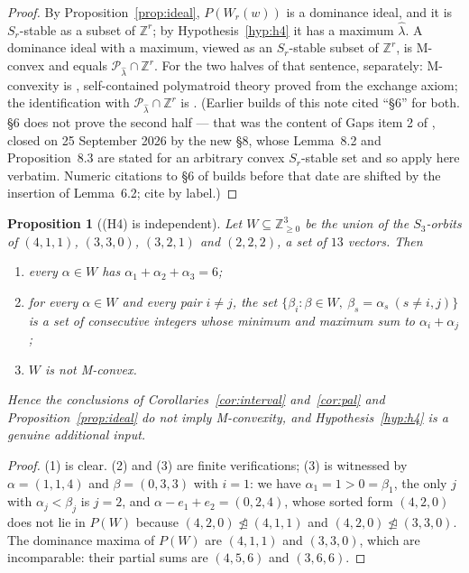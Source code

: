 \documentclass[11pt]{article}
\newtheorem{prop}[thm]{Proposition}
\theoremstyle{definition}
\newcommand{\Z}{\mathbb{Z}}
\begin{document}
\begin{proof}
By Proposition~\ref{prop:ideal}, $P(W_r(w))$ is a dominance ideal, and it is $S_r$-stable as a
subset of $\Z^r$; by Hypothesis~\ref{hyp:h4} it has a maximum $\widehat\lambda$. A dominance
ideal with a maximum, viewed as an $S_r$-stable subset of $\Z^r$, is M-convex and equals
$\mathcal P_{\widehat\lambda}\cap\Z^r$. For the two halves of that sentence, separately:
M-convexity is \cite[Lem.~6.2 and Prop.~6.3]{Clio2026}, self-contained polymatroid theory proved
from the exchange axiom; the identification with $\mathcal P_{\widehat\lambda}\cap\Z^r$ is
\cite[Thm.~8.1 and Prop.~8.3]{Clio2026}. (Earlier builds of this note cited ``\S6'' for both.
\S6 does not prove the second half --- that was the content of Gaps item 2 of \cite{Clio2026},
closed on 25 September 2026 by the new \S8, whose Lemma~8.2 and Proposition~8.3 are stated for an
arbitrary convex $S_r$-stable set and so apply here verbatim. Numeric citations to \S6 of builds
before that date are shifted by the insertion of Lemma~6.2; cite by label.)
\end{proof}

\begin{prop}[(H4) is independent]\label{prop:h4indep}
Let $W\subseteq\Z^3_{\ge0}$ be the union of the $S_3$-orbits of $(4,1,1)$, $(3,3,0)$, $(3,2,1)$
and $(2,2,2)$, a set of $13$ vectors. Then
\begin{enumerate}
\item every $\alpha\in W$ has $\alpha_1+\alpha_2+\alpha_3=6$;
\item for every $\alpha\in W$ and every pair $i\ne j$, the set
$\{\beta_i:\beta\in W,\ \beta_s=\alpha_s\ (s\ne i,j)\}$ is a set of consecutive integers whose
minimum and maximum sum to $\alpha_i+\alpha_j$;
\item $W$ is \emph{not} M-convex.
\end{enumerate}
Hence the conclusions of Corollaries~\ref{cor:interval} and~\ref{cor:pal} and
Proposition~\ref{prop:ideal} do not imply M-convexity, and
Hypothesis~\ref{hyp:h4} is a genuine additional input.
\end{prop}

\begin{proof}
(1) is clear. (2) and (3) are finite verifications; (3) is witnessed by
$\alpha=(1,1,4)$ and $\beta=(0,3,3)$ with $i=1$: we have $\alpha_1=1>0=\beta_1$, the only
$j$ with $\alpha_j<\beta_j$ is $j=2$, and $\alpha-e_1+e_2=(0,2,4)$, whose sorted form
$(4,2,0)$ does not lie in $P(W)$ because $(4,2,0)\ntrianglelefteq(4,1,1)$ and
$(4,2,0)\ntrianglelefteq(3,3,0)$. The dominance maxima of $P(W)$ are $(4,1,1)$ and $(3,3,0)$,
which are incomparable: their partial sums are $(4,5,6)$ and $(3,6,6)$.
\end{proof}
\end{document}
